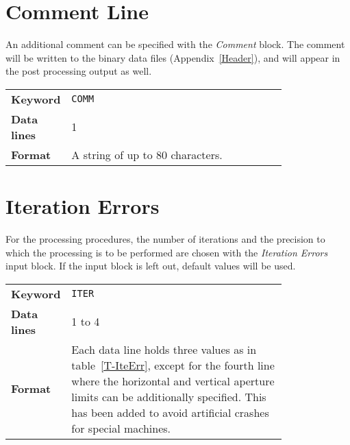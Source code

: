 \section{Comment Line} \label{ComLin}

An additional comment can be specified with the \textit{Comment} block.
The comment will be written to the binary data files (Appendix~\ref{Header}), and will appear in the post processing output as well.

\bigskip
\begin{tabular}{@{}lp{0.8\linewidth}}
    \textbf{Keyword}    & \texttt{COMM} \\
    \textbf{Data lines} & 1 \\
    \textbf{Format}     & A string of up to 80 characters.
\end{tabular}

\section{Iteration Errors} \label{IteErr}

For the processing procedures, the number of iterations and the precision to which the processing is to be performed are chosen with the \textit{Iteration Errors} input block.
If the input block is left out, default values will be used.

\bigskip
\begin{tabular}{@{}lp{0.8\linewidth}}
    \textbf{Keyword}    & \texttt{ITER} \\
    \textbf{Data lines} & 1 to 4 \\
    \textbf{Format}     & Each data line holds three values as in table~\ref{T-IteErr}, except for the fourth line where the horizontal and vertical aperture limits can be additionally specified. This has been added to avoid artificial crashes for special machines.
\end{tabular}

